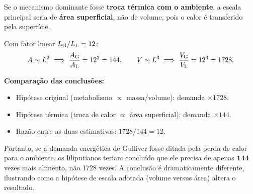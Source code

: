 Se o mecanismo dominante fosse \textbf{troca térmica com o ambiente}, a escala principal seria de \textbf{área superficial}, não de volume, pois o calor é transferido pela superfície.

Com fator linear $L_{\rm G}/L_{\rm L} = 12$:
\[
A \sim L^2 \implies \frac{A_{\rm G}}{A_{\rm L}} = 12^2 = 144, \qquad V \sim L^3 \implies \frac{V_{\rm G}}{V_{\rm L}} = 12^3 = 1728.
\]

\textbf{Comparação das conclusões:}
\begin{itemize}
\item Hipótese original (metabolismo $\propto$ massa/volume): demanda $\times 1728$.
\item Hipótese térmica (troca de calor $\propto$ área superficial): demanda $\times 144$.
\item Razão entre as duas estimativas: $1728/144 = 12$.
\end{itemize}

Portanto, se a demanda energética de Gulliver fosse ditada pela perda de calor para o ambiente, os liliputianos teriam concluído que ele precisa de apenas $\mathbf{144}$ vezes mais alimento, não 1728 vezes. A conclusão é dramaticamente diferente, ilustrando como a hipótese de escala adotada (volume versus área) altera o resultado.

